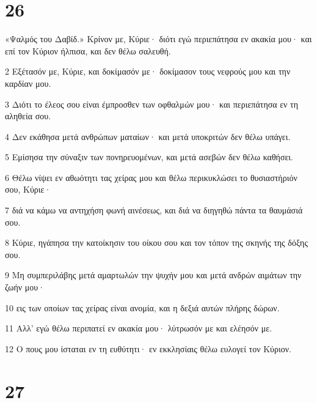 \chapter{26}

\par «Ψαλμός του Δαβίδ.» Κρίνον με, Κύριε· διότι εγώ περιεπάτησα εν ακακία μου· και επί τον Κύριον ήλπισα, και δεν θέλω σαλευθή.
\par 2 Εξέτασόν με, Κύριε, και δοκίμασόν με· δοκίμασον τους νεφρούς μου και την καρδίαν μου.
\par 3 Διότι το έλεος σου είναι έμπροσθεν των οφθαλμών μου· και περιεπάτησα εν τη αληθεία σου.
\par 4 Δεν εκάθησα μετά ανθρώπων ματαίων· και μετά υποκριτών δεν θέλω υπάγει.
\par 5 Εμίσησα την σύναξιν των πονηρευομένων, και μετά ασεβών δεν θέλω καθήσει.
\par 6 Θέλω νίψει εν αθωότητι τας χείρας μου και θέλω περικυκλώσει το θυσιαστήριόν σου, Κύριε·
\par 7 διά να κάμω να αντηχήση φωνή αινέσεως, και διά να διηγηθώ πάντα τα θαυμάσιά σου.
\par 8 Κύριε, ηγάπησα την κατοίκησιν του οίκου σου και τον τόπον της σκηνής της δόξης σου.
\par 9 Μη συμπεριλάβης μετά αμαρτωλών την ψυχήν μου και μετά ανδρών αιμάτων την ζωήν μου·
\par 10 εις των οποίων τας χείρας είναι ανομία, και η δεξιά αυτών πλήρης δώρων.
\par 11 Αλλ' εγώ θέλω περιπατεί εν ακακία μου· λύτρωσόν με και ελέησόν με.
\par 12 Ο πους μου ίσταται εν τη ευθύτητι· εν εκκλησίαις θέλω ευλογεί τον Κύριον.

\chapter{27}

